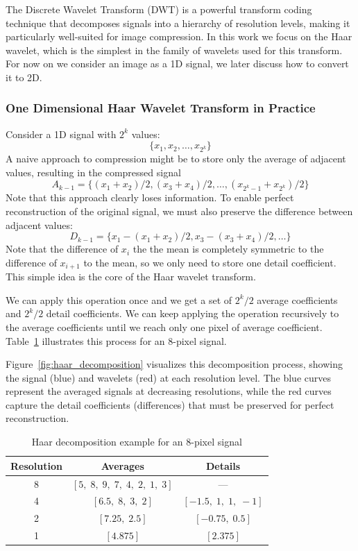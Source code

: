 
The Discrete Wavelet Transform (DWT) is a powerful transform coding technique that decomposes signals into a hierarchy of resolution levels, making it particularly well-suited for image compression. In this work we focus on the Haar wavelet, which is the simplest in the family of wavelets used for this transform. For now on we consider an image as a 1D signal, we later discuss how to convert it to 2D.

\subsubsection{One Dimensional Haar Wavelet Transform in Practice}

Consider a 1D signal with $2^k$ values: $$ \{x_1, x_2, \dots, x_{2^k}\}$$ A naive approach to compression might be to store only the average of adjacent values, resulting in the compressed signal $$A_{k-1} = \{(x_1 + x_2) / 2, (x_3 + x_4) / 2, \dots, (x_{2^k-1} + x_{2^k})/2\}$$ Note that this approach clearly loses information. To enable perfect reconstruction of the original signal, we must also preserve the difference between adjacent values: $$D_{k-1} = \{x_1 - (x_1 + x_2) / 2, x_3 - (x_3 + x_4) / 2, \dots\}$$
Note that the difference of $x_i$ the the mean is completely symmetric to the difference of $x_{i+1}$ to the mean, so we only need to store one detail coefficient. This simple idea is the core of the Haar wavelet transform.

We can apply this operation once and we get a set of $2^k/2$ average coefficients and $2^k/2$ detail coefficients. We can keep applying the operation recursively to the average coefficients until we reach only one pixel of average coefficient. Table~\ref{tab:haar_decomposition} illustrates this process for an 8-pixel signal.

Figure~\ref{fig:haar_decomposition} visualizes this decomposition process, showing the signal (blue) and wavelets (red) at each resolution level. The blue curves represent the averaged signals at decreasing resolutions, while the red curves capture the detail coefficients (differences) that must be preserved for perfect reconstruction.

\begin{table}[h]
  \centering
  \caption{Haar decomposition example for an 8-pixel signal}
  \label{tab:haar_decomposition}
  \begin{tabular}{c c c}
    \toprule
    \textbf{Resolution} & \textbf{Averages} & \textbf{Details} \\
    \midrule
    8 & $[5, \; 8, \; 9, \; 7, \; 4, \; 2, \; 1, \; 3]$ & --- \\
    4 & $[6.5, \; 8, \; 3, \; 2]$ & $[-1.5, \; 1, \; 1, \; -1]$ \\
    2 & $[7.25, \; 2.5]$ & $[-0.75, \; 0.5]$ \\
    1 & $[4.875]$ & $[2.375]$ \\
    \bottomrule
  \end{tabular}
\end{table}

